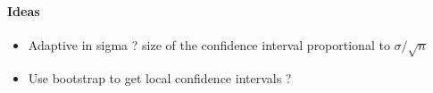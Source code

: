 \paragraph{Ideas}

\begin{itemize}
\item Adaptive in sigma ? size of the confidence interval proportional to $\sigma / \sqrt{n}$
\item Use bootstrap to get local confidence intervals ?
\end{itemize}






























